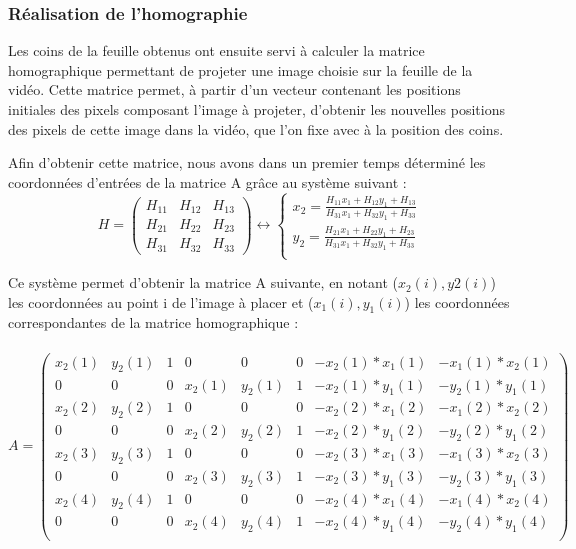 \documentclass[blue]{ceri/sty/rapport}
\begin{document}
\subsubsection{Réalisation de l'homographie}

Les coins de la feuille obtenus ont ensuite servi à calculer la matrice homographique permettant de projeter une image choisie sur la feuille de la vidéo. Cette matrice permet, à partir d'un vecteur contenant les positions initiales des pixels composant l'image à projeter, d'obtenir les nouvelles positions des pixels de cette image dans la vidéo, que l'on fixe avec à la position des coins. 

Afin d'obtenir cette matrice, nous avons dans un premier temps déterminé les coordonnées d'entrées de la matrice A grâce au système suivant :
\[
H = \begin{pmatrix}H_{11}&H_{12}&H_{13}\\
H_{21}&H_{22}&H_{23}\\
H_{31}&H_{32}&H_{33}
\end{pmatrix}  
\longleftrightarrow
\left \{ 
\begin{array}{cc}
 x_2= \frac{H_{11}x_1 + H_{12}y_1 + H_{13}}{H_{31}x_1 + H_{32}y_1 + H_{33}}  \\
 y_2= \frac{H_{21}x_1 + H_{22}y_1 + H_{23}}{H_{31}x_1 + H_{32}y_1 + H_{33}}  \\
\end{array}
\right .  
\]

Ce système permet d'obtenir la matrice A suivante, en notant ($x_2(i),y2(i)$) les coordonnées au point i de l'image à placer et ($x_1(i),y_1(i)$) les coordonnées correspondantes de la matrice homographique : \\
\\

$A = \begin{pmatrix}x_2(1)&y_2(1)&1&0&0&0&-x_2(1)*x_1(1)&-x_1(1)*x_2(1)\\ 
0&0&0&x_2(1)&y_2(1)&1&-x_2(1)*y_1(1)&-y_2(1)*y_1(1)\\ 
x_2(2)&y_2(2)&1&0&0&0&-x_2(2)*x_1(2)&-x_1(2)*x_2(2)\\ 
0&0&0&x_2(2)&y_2(2)&1&-x_2(2)*y_1(2)&-y_2(2)*y_1(2)\\ 
x_2(3)&y_2(3)&1&0&0&0&-x_2(3)*x_1(3)&-x_1(3)*x_2(3)\\ 
0&0&0&x_2(3)&y_2(3)&1&-x_2(3)*y_1(3)&-y_2(3)*y_1(3)\\ 
x_2(4)&y_2(4)&1&0&0&0&-x_2(4)*x_1(4)&-x_1(4)*x_2(4)\\ 
0&0&0&x_2(4)&y_2(4)&1&-x_2(4)*y_1(4)&-y_2(4)*y_1(4)\\ 
\end{pmatrix} $
\vspace{0.5cm}
\end{document}
